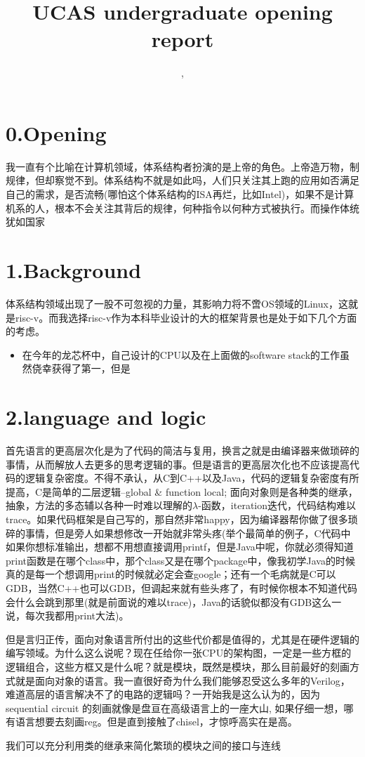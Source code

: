 \documentclass[11pt]{article}
\title{UCAS undergraduate opening report}
\author{\Name, \SID}
\date{}
\begin{document}
\maketitle
\section*{0.Opening}
我一直有个比喻在计算机领域，体系结构者扮演的是上帝的角色。上帝造万物，制规律，但却察觉不到。体系结构不就是如此吗，人们只关注其上跑的应用如否满足自己的需求，是否流畅(哪怕这个体系结构的ISA再烂，比如Intel)，如果不是计算机系的人，根本不会关注其背后的规律，何种指令以何种方式被执行。而操作体统犹如国家

\section*{1.Background}
体系结构领域出现了一股不可忽视的力量，其影响力将不啻OS领域的Linux，这就是risc-v。而我选择risc-v作为本科毕业设计的大的框架背景也是处于如下几个方面的考虑。
\begin{itemize}
	\item 在今年的龙芯杯中，自己设计的CPU以及在上面做的software stack的工作虽然侥幸获得了第一，但是
\end{itemize}

\section*{2.language and logic}
首先语言的更高层次化是为了代码的简洁与复用，换言之就是由编译器来做琐碎的事情，从而解放人去更多的思考逻辑的事。但是语言的更高层次化也不应该提高代码的逻辑复杂密度。不得不承认，从C到C++以及Java，代码的逻辑复杂密度有所提高，C是简单的二层逻辑--global \& function local; 面向对象则是各种类的继承，抽象，方法的多态辅以各种一时难以理解的$ \lambda $-函数，iteration迭代，代码结构难以trace。如果代码框架是自己写的，那自然非常happy，因为编译器帮你做了很多琐碎的事情，但是旁人如果想修改一开始就非常头疼(举个最简单的例子，C代码中如果你想标准输出，想都不用想直接调用printf，但是Java中呢，你就必须得知道print函数是在哪个class中，那个class又是在哪个package中，像我初学Java的时候真的是每一个想调用print的时候就必定会查google；还有一个毛病就是C可以GDB，当然C++也可以GDB，但调起来就有些头疼了，有时候你根本不知道代码会什么会跳到那里(就是前面说的难以trace)，Java的话貌似都没有GDB这么一说，每次我都用print大法)。

但是言归正传，面向对象语言所付出的这些代价都是值得的，尤其是在硬件逻辑的编写领域。为什么这么说呢？现在任给你一张CPU的架构图，一定是一些方框的逻辑组合，这些方框又是什么呢？就是模块，既然是模块，那么目前最好的刻画方式就是面向对象的语言。我一直很好奇为什么我们能够忍受这么多年的Verilog，难道高层的语言解决不了的电路的逻辑吗？一开始我是这么认为的，因为sequential circuit 的刻画就像是盘亘在高级语言上的一座大山, 如果仔细一想，哪有语言想要去刻画reg。但是直到接触了chisel，才惊呼高实在是高。

我们可以充分利用类的继承来简化繁琐的模块之间的接口与连线
\def\St{\State}
\DeclarePairedDelimiter\ceil{\lceil}{\rceil}
\DeclarePairedDelimiter\floor{\lfloor}{\rfloor}
\end{document}
